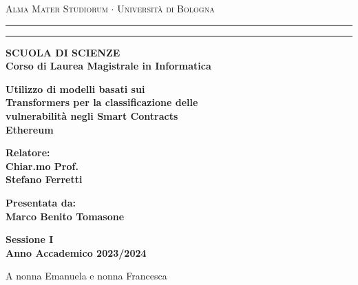 \documentclass[12pt,a4paper]{report}
\newenvironment{dedication}
{%
\thispagestyle{empty}%
\vspace*{\stretch{1}}%
\itshape             %
\raggedleft          %
}
{\par %
\vspace{\stretch{3}} %
\clearpage           %
}
\begin{document}
\begin{titlepage}
    \begin{center}
    {{\Large{\textsc{Alma Mater Studiorum $\cdot$ Universit\`a di
    Bologna}}}} \rule[0.1cm]{15.8cm}{0.1mm}
    \rule[0.5cm]{15.8cm}{0.6mm}
    {\small{\bf SCUOLA DI SCIENZE\\
    Corso di Laurea Magistrale in Informatica }}
    \end{center}
    \vspace{15mm}
    \begin{center}
    {\LARGE{\bf Utilizzo di modelli basati sui }}\\
    \vspace{3mm}
    {\LARGE{\bf Transformers per la classificazione delle }}\\
    \vspace{3mm}
    {\LARGE{\bf vulnerabilit\`a negli Smart Contracts}}\\
    \vspace{3mm}
    {\LARGE{\bf Ethereum}}\\
    \end{center}
    \vspace{40mm}
    \par
    \noindent
    \begin{minipage}[t]{0.47\textwidth}
    {\large{\bf Relatore:\\
    Chiar.mo Prof.\\
    Stefano Ferretti\\

    }}
    \end{minipage}
    \hfill
    \begin{minipage}[t]{0.47\textwidth}\raggedleft
    {\large{\bf Presentata da:\\
    Marco Benito Tomasone}}
    \end{minipage}
    \vspace{20mm}
    \begin{center}
    {\large{\bf Sessione I\\%
    Anno Accademico 2023/2024}}%
    \end{center}
    \end{titlepage}

    \begin{dedication}
       A nonna Emanuela e nonna Francesca
    \end{dedication}
    \tableofcontents
    \listoffigures
    \listoftables
    











\nocite{*}


\end{document}
